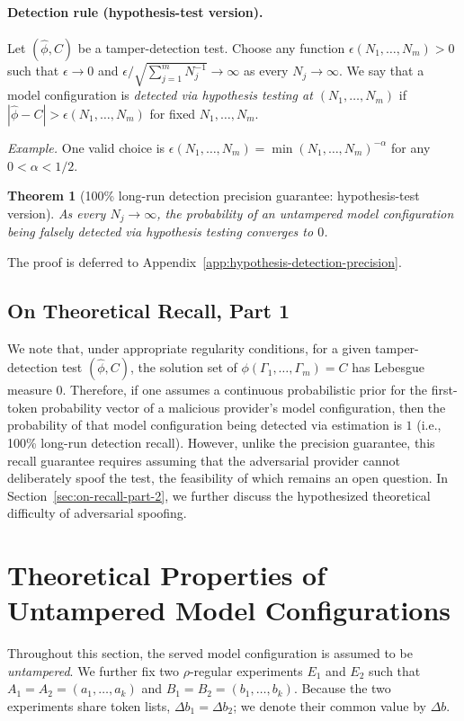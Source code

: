 \documentclass{article}
\newtheorem{theorem}{Theorem}
\begin{document}
\paragraph{Detection rule (hypothesis-test version).}
Let $(\widehat{\phi},C)$ be a tamper-detection test. Choose any function
$\epsilon(N_1,\ldots,N_m)>0$ such that $\epsilon\to0$ and
$\epsilon/\sqrt{\sum_{j=1}^m N_j^{-1}}\to\infty$ as every
$N_j\to\infty$. We say that a model configuration is \emph{detected via
hypothesis testing at $(N_1,\ldots,N_m)$} if
$|\widehat{\phi}-C|>\epsilon(N_1,\ldots,N_m)$ for fixed
$N_1,\ldots,N_m$.

\emph{Example.} One valid choice is
$\epsilon(N_1,\ldots,N_m)=\min(N_1,\ldots,N_m)^{-\alpha}$ for any
$0<\alpha<1/2$.

\begin{theorem}[100\% long-run detection precision guarantee: hypothesis-test version]
\label{thm:hypothesis-detection-precision}
As every $N_j\to\infty$, the probability of an untampered model configuration
being falsely detected via hypothesis testing converges to $0$.
\end{theorem}

The proof is deferred to Appendix~\ref{app:hypothesis-detection-precision}.

\subsection{On Theoretical Recall, Part 1}
\label{sec:on-recall-part-1}

We note that, under appropriate regularity conditions, for a given
tamper-detection test $(\widehat{\phi},C)$, the solution set of
$\phi(\Gamma_1,\ldots,\Gamma_m)=C$ has Lebesgue measure $0$. Therefore, if one
assumes a continuous probabilistic prior for the first-token probability vector
of a malicious provider's model configuration, then the probability of that
model configuration being detected via estimation is $1$ (i.e., 100\% long-run
detection recall). However, unlike the precision guarantee, this recall
guarantee requires assuming that the adversarial provider cannot deliberately
spoof the test, the feasibility of which remains an open question. In
Section~\ref{sec:on-recall-part-2}, we further discuss the hypothesized theoretical difficulty of
adversarial spoofing.

\section{Theoretical Properties of Untampered Model Configurations}
Throughout this section, the served model configuration is assumed to be
\emph{untampered}. We further fix two $\rho$-regular experiments $E_1$ and
$E_2$ such that $A_1=A_2=(a_1,\ldots,a_k)$ and
$B_1=B_2=(b_1,\ldots,b_k)$. Because the two experiments share token lists,
$\Delta b_1=\Delta b_2$; we denote their common value by $\Delta b$.
\end{document}
